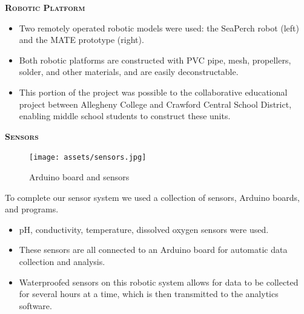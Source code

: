 \documentclass[final,t]{beamer}
\begin{document}
\begin{frame}{}
\begin{columns}
\begin{column}{.5\linewidth}
\begin{block}{\textsc{\textbf{Robotic Platform}}}
                    \begin{itemize}
                    	\item Two remotely operated robotic models were used: the
                      SeaPerch robot (left) and the MATE prototype (right).
                    	\item Both robotic platforms are constructed with PVC pipe,
                      mesh, propellers, solder, and other materials, and are easily
                      deconstructable.
                    	\item This portion of the project was possible to the
                      collaborative educational project between Allegheny College
                      and Crawford Central School District, enabling middle school
                      students to construct these units.
                    \end{itemize}

                    \vspace*{3mm}
                \end{block}
                \begin{block}{\textsc{\textbf{Sensors}}}
                    \vspace*{3mm}

                    \begin{figure}
                        \centering
                        \texttt{[image: assets/sensors.jpg]}
                        \caption{Arduino board and sensors}
                    \end{figure}
                    To complete our sensor system we used a collection of sensors,
                    Arduino boards, and programs.
                    \begin{itemize}
                    	\item pH, conductivity, temperature, dissolved oxygen sensors
                      were used.
                    	\item These sensors are all connected to an Arduino board
                      for automatic data collection and analysis.
                     	\item Waterproofed sensors on this robotic system allows for
                      data to be collected for several hours at a time, which is
                      then transmitted to the analytics software.
                     \end{itemize}


\end{block}
\end{column}
\end{columns}
\end{frame}
\end{document}
